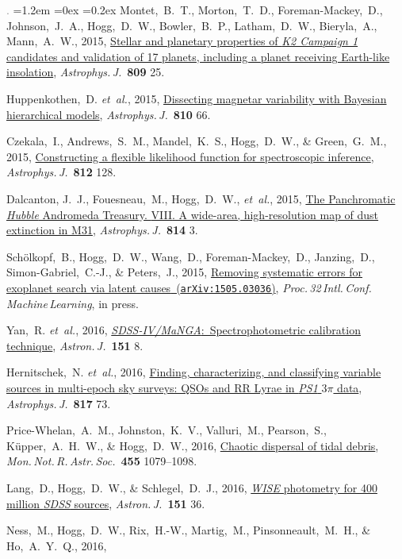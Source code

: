 \documentclass[10pt,letterpaper]{article}
\newcommand{\acronym}[1]{{\small{#1}}}
\newcommand{\foreign}[1]{\textsl{#1}}
\newcommand{\etal}{\foreign{et~al.}}
\newcommand{\project}[1]{\textsl{#1}}
\newcommand{\doi}[2]{\href{http://dx.doi.org/#1}{{#2}}}
\newcommand{\arxiv}[2]{\href{http://arxiv.org/abs/#1}{{#2}\ (\texttt{arXiv:#1})}}
\newcommand{\deemph}[1]{\textcolor{grey}{\footnotesize{#1}}}
\newcommand{\pubnumber}[1]{\deemph{{#1}.}}
\newcounter{refpubnum}
\newcommand{\hogglist}{%
    \rightmargin=0in
    \leftmargin=1.2em
    \topsep=0ex
    \partopsep=0pt
    \itemsep=0.2ex
    \parsep=0pt
    \itemindent=-1.0\leftmargin
    \listparindent=0.0\leftmargin
    \settowidth{\labelsep}{~}
    \usecounter{refpubnum}
  }
\begin{document}
\begin{list}{\pubnumber{\therefpubnum}}{\hogglist}
Montet,~B.~T., Morton,~T.~D., Foreman-Mackey,~D., Johnson,~J.~A., Hogg,~D.~W.,
Bowler,~B.~P., Latham,~D.~W., Bieryla,~A., Mann,~A.~W., 2015,
\doi{10.1088/0004-637X/809/1/25}{Stellar and planetary properties of
\project{K2 Campaign 1} candidates and validation of 17 planets,
including a planet receiving Earth-like insolation},
\textit{Astrophys.\,J.}\ \textbf{809} 25.
\item
Huppenkothen,~D. \etal, 2015,
\doi{10.1088/0004-637X/810/1/66}{Dissecting magnetar variability with
  Bayesian hierarchical models},
\textit{Astrophys.\,J.}\ \textbf{810} 66.
\item
Czekala,~I., Andrews,~S.~M., Mandel,~K.~S., Hogg,~D.~W., \& Green,~G.~M., 2015,
\doi{10.1088/0004-637X/812/2/128}{Constructing a flexible likelihood
  function for spectroscopic inference},
\textit{Astrophys.\,J.}\ \textbf{812} 128.
\item
Dalcanton, J.~J., Fouesneau,~M., Hogg,~D.~W., \etal, 2015,
\doi{10.1088/0004-637X/814/1/3}{The Panchromatic \project{Hubble} Andromeda Treasury. \acronym{VIII}.
A wide-area, high-resolution map of dust extinction in M31},
\textit{Astrophys.\,J.}\ \textbf{814} 3.
\item
Sch\"olkopf,~B., Hogg,~D.~W., Wang,~D., Foreman-Mackey,~D., Janzing,~D.,
Simon-Gabriel,~C.-J., \& Peters,~J., 2015,
\arxiv{1505.03036}{Removing systematic errors for exoplanet search via latent causes},
\textit{Proc.\,32\,Intl.\,Conf.\,Machine\,Learning}, in press.
\item
Yan,~R. \etal, 2016,
\doi{10.3847/0004-6256/151/1/8}{\project{\acronym{SDSS-IV/MaNGA}}:\ Spectrophotometric calibration technique},
\textit{Astron.\,J.}\ \textbf{151} 8.
\item
Hernitschek,~N. \etal, 2016,
\doi{10.3847/0004-637X/817/1/73}{Finding, characterizing, and classifying variable sources in
multi-epoch sky surveys: QSOs and RR Lyrae in \project{PS1} $3\pi$ data},
\textit{Astrophys.\,J.}\ \textbf{817} 73.
\item
Price-Whelan,~A.~M., Johnston,~K.~V., Valluri,~M., Pearson,~S.,
K\"upper,~A.~H.~W., \& Hogg,~D.~W., 2016,
\doi{10.1093/mnras/stv2383}{Chaotic dispersal of tidal debris},
\textit{Mon.\,Not.\,R.\,Astr.\,Soc.}\ \textbf{455} 1079--1098.
\item
Lang,~D., Hogg,~D.~W., \& Schlegel,~D.~J., 2016,
\doi{10.3847/0004-6256/151/2/36}{\project{WISE} photometry for 400 million \project{SDSS} sources},
\textit{Astron.\,J.}\ \textbf{151} 36.
\item
Ness,~M., Hogg,~D.~W., Rix,~H.-W., Martig,~M., Pinsonneault,~M.~H., \& Ho,~A.~Y.~Q., 2016,

\end{list}
\end{document}
